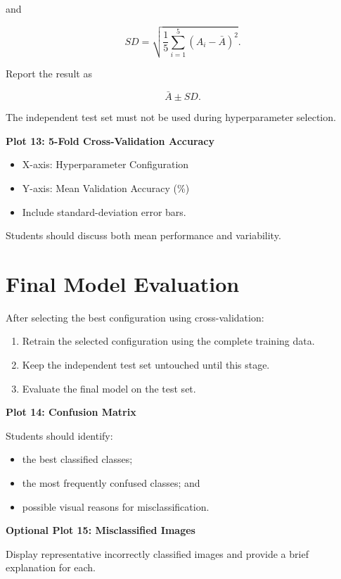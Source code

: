 \documentclass[10pt]{article}
\begin{document}
and

\[
SD=
\sqrt{
\frac{1}{5}
\sum_{i=1}^{5}(A_i-\bar{A})^2
}.
\]

Report the result as

\[
\boxed{\bar{A}\pm SD}.
\]

The independent test set must not be used during hyperparameter selection.


\textbf{Plot 13: 5-Fold Cross-Validation Accuracy}

\begin{itemize}
\item X-axis: Hyperparameter Configuration
\item Y-axis: Mean Validation Accuracy (\%)
\item Include standard-deviation error bars.
\end{itemize}

Students should discuss both mean performance and variability.

\section{Final Model Evaluation}

After selecting the best configuration using cross-validation:

\begin{enumerate}
\item Retrain the selected configuration using the complete training data.
\item Keep the independent test set untouched until this stage.
\item Evaluate the final model on the test set.
\end{enumerate}

\textbf{Plot 14: Confusion Matrix}

Students should identify:

\begin{itemize}
\item the best classified classes;
\item the most frequently confused classes; and
\item possible visual reasons for misclassification.
\end{itemize}

\textbf{Optional Plot 15: Misclassified Images}

Display representative incorrectly classified images and provide a
brief explanation for each.
\end{document}
